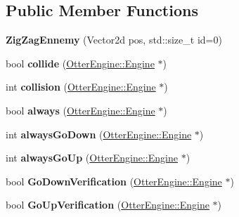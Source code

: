 \subsection*{Public Member Functions}
\begin{DoxyCompactItemize}
\item 
{\bfseries Zig\+Zag\+Ennemy} (Vector2d pos, std\+::size\+\_\+t id=0)\hypertarget{class_zig_zag_ennemy_a5a8b4dcab33d424f2f3a868153ca3da2}{}\label{class_zig_zag_ennemy_a5a8b4dcab33d424f2f3a868153ca3da2}

\item 
bool {\bfseries collide} (\hyperlink{class_otter_engine_1_1_engine}{Otter\+Engine\+::\+Engine} $\ast$)\hypertarget{class_zig_zag_ennemy_a891e775456b514955a7d47c0b35a14ab}{}\label{class_zig_zag_ennemy_a891e775456b514955a7d47c0b35a14ab}

\item 
int {\bfseries collision} (\hyperlink{class_otter_engine_1_1_engine}{Otter\+Engine\+::\+Engine} $\ast$)\hypertarget{class_zig_zag_ennemy_a2bc3347e8682d82081bae558c5066ec9}{}\label{class_zig_zag_ennemy_a2bc3347e8682d82081bae558c5066ec9}

\item 
bool {\bfseries always} (\hyperlink{class_otter_engine_1_1_engine}{Otter\+Engine\+::\+Engine} $\ast$)\hypertarget{class_zig_zag_ennemy_a89e5e70acfd829b512112b1fccb3d195}{}\label{class_zig_zag_ennemy_a89e5e70acfd829b512112b1fccb3d195}

\item 
int {\bfseries always\+Go\+Down} (\hyperlink{class_otter_engine_1_1_engine}{Otter\+Engine\+::\+Engine} $\ast$)\hypertarget{class_zig_zag_ennemy_a1c6aa1185a44602d8d97232b1d8cf08b}{}\label{class_zig_zag_ennemy_a1c6aa1185a44602d8d97232b1d8cf08b}

\item 
int {\bfseries always\+Go\+Up} (\hyperlink{class_otter_engine_1_1_engine}{Otter\+Engine\+::\+Engine} $\ast$)\hypertarget{class_zig_zag_ennemy_ac8ce0d52dfce871496a8132c04c5b4b3}{}\label{class_zig_zag_ennemy_ac8ce0d52dfce871496a8132c04c5b4b3}

\item 
bool {\bfseries Go\+Down\+Verification} (\hyperlink{class_otter_engine_1_1_engine}{Otter\+Engine\+::\+Engine} $\ast$)\hypertarget{class_zig_zag_ennemy_acaf90af952a324d6bbced1e840733175}{}\label{class_zig_zag_ennemy_acaf90af952a324d6bbced1e840733175}

\item 
bool {\bfseries Go\+Up\+Verification} (\hyperlink{class_otter_engine_1_1_engine}{Otter\+Engine\+::\+Engine} $\ast$)\hypertarget{class_zig_zag_ennemy_ae0ca21fa1cfd5a75d5ae0b6afb7ccb18}{}\label{class_zig_zag_ennemy_ae0ca21fa1cfd5a75d5ae0b6afb7ccb18}


\end{DoxyCompactItemize}

